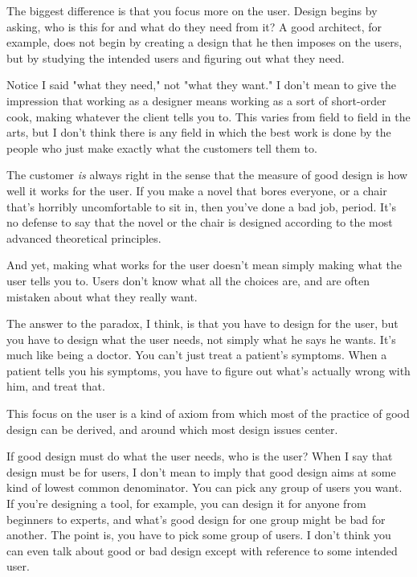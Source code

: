 The biggest difference
                  is that you focus more on the user. Design begins by asking,
                  who is this for and what do they need from it? A good
                  architect, for example, does not begin by creating a design
                  that he then imposes on the users, but by studying the
                  intended users and figuring out what they need.

Notice
                  I said "what they need," not "what they want." I don't mean to
                  give the impression that working as a designer means working
                  as a sort of short-order cook, making whatever the client
                  tells you to. This varies from field to field in the arts, but
                  I don't think there is any field in which the best work is
                  done by the people who just make exactly what the customers
                  tell them to.

The customer \emph{is} always right
                  in the sense that the measure of good design is how well it
                  works for the user. If you make a novel that bores everyone,
                  or a chair that's horribly uncomfortable to sit in, then
                  you've done a bad job, period. It's no defense to say that the
                  novel or the chair is designed according to the most advanced
                  theoretical principles.

And yet, making what works
                  for the user doesn't mean simply making what the user tells
                  you to. Users don't know what all the choices are, and are
                  often mistaken about what they really want.

The
                  answer to the paradox, I think, is that you have to design for
                  the user, but you have to design what the user needs, not
                  simply what he says he wants. It's much like being a doctor.
                  You can't just treat a patient's symptoms. When a patient
                  tells you his symptoms, you have to figure out what's actually
                  wrong with him, and treat that.

This focus on the
                  user is a kind of axiom from which most of the practice of
                  good design can be derived, and around which most design
                  issues center.



If good design must do
                  what the user needs, who is the user? When I say that design
                  must be for users, I don't mean to imply that good design aims
                  at some kind of lowest common denominator. You can pick any
                  group of users you want. If you're designing a tool, for
                  example, you can design it for anyone from beginners to
                  experts, and what's good design for one group might be bad for
                  another. The point is, you have to pick some group of users. I
                  don't think you can even talk about good or bad design except
                  with reference to some intended user.


